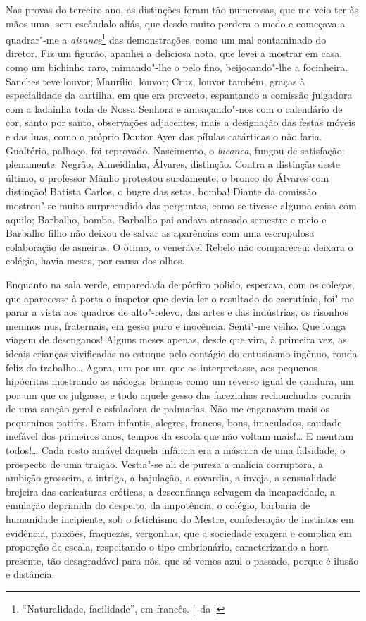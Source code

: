 Nas provas do terceiro ano, as distinções foram
tão numerosas, que me veio ter às mãos uma, sem escândalo aliás, que
desde muito perdera o medo e começava a quadrar"-me a \textit{aisance}\footnote{ ``Naturalidade, 
facilidade'', em francês. [~da ]} das
demonstrações, como um mal contaminado do diretor. Fiz um figurão,
apanhei a deliciosa nota, que levei a mostrar em casa, como um bichinho
raro, mimando"-lhe o pelo fino, beijocando"-lhe a focinheira. Sanches
teve louvor; Maurílio, louvor; Cruz, louvor também, graças à
especialidade da cartilha, em que era provecto, espantando a comissão
julgadora com a ladainha toda de Nossa Senhora e ameaçando"-nos com o
calendário de cor, santo por santo, observações adjacentes, mais a
designação das festas móveis e das luas, como o próprio Doutor Ayer das
pílulas catárticas o não faria. Gualtério, palhaço, foi reprovado.
Nascimento, o \textit{bicanca}, fungou de satisfação: plenamente. Negrão,
Almeidinha, Álvares, distinção. Contra a distinção deste último, o
professor Mânlio protestou surdamente; o bronco do Álvares com
distinção! Batista Carlos, o bugre das setas, bomba! Diante da comissão
mostrou"-se muito surpreendido das perguntas, como se tivesse alguma
coisa com aquilo; Barbalho, bomba. Barbalho pai andava atrasado
semestre e meio e Barbalho filho não deixou de salvar as aparências com
uma escrupulosa colaboração de asneiras. O ótimo, o venerável Rebelo
não compareceu: deixara o colégio, havia meses, por causa dos olhos.

Enquanto na sala verde, emparedada de pórfiro polido, esperava, com os
colegas, que aparecesse à porta o inspetor que devia ler o resultado do
escrutínio, foi"-me parar a vista aos quadros de alto"-relevo, das artes
e das indústrias, os risonhos meninos nus, fraternais, em gesso puro e
inocência. Senti"-me velho. Que longa viagem de desenganos! Alguns
meses apenas, desde que vira, à primeira vez, as ideais crianças
vivificadas no estuque pelo contágio do entusiasmo ingênuo, ronda feliz
do trabalho\ldots{} Agora, um por um que os interpretasse, aos pequenos
hipócritas mostrando as nádegas brancas como um reverso igual de
candura, um por um que os julgasse, e todo aquele gesso das facezinhas
rechonchudas coraria de uma sanção geral e esfoladora de palmadas. Não
me enganavam mais os pequeninos patifes. Eram infantis, alegres,
francos, bons, imaculados, saudade inefável dos primeiros anos, tempos
da escola que não voltam mais!\ldots{} E mentiam todos!\ldots{} Cada rosto amável
daquela infância era a máscara de uma falsidade, o prospecto de uma
traição. Vestia"-se ali de pureza a malícia corruptora, a ambição
grosseira, a intriga, a bajulação, a covardia, a inveja, a sensualidade
brejeira das caricaturas eróticas, a desconfiança selvagem da
incapacidade, a emulação deprimida do despeito, da impotência, o
colégio, barbaria de humanidade incipiente, sob o fetichismo do Mestre,
confederação de instintos em evidência, paixões, fraquezas, vergonhas,
que a sociedade exagera e complica em proporção de escala, respeitando
o tipo embrionário, caracterizando a hora presente, tão desagradável
para nós, que só vemos azul o passado, porque é ilusão e distância.

